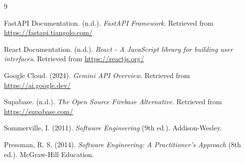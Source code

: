 \begin{thebibliography}{9}

FastAPI Documentation. (n.d.). \textit{FastAPI Framework}. Retrieved from \url{https://fastapi.tiangolo.com/}

React Documentation. (n.d.). \textit{React - A JavaScript library for building user interfaces}. Retrieved from \url{https://reactjs.org/}

Google Cloud. (2024). \textit{Gemini API Overview}. Retrieved from \url{https://ai.google.dev/}

Supabase. (n.d.). \textit{The Open Source Firebase Alternative}. Retrieved from \url{https://supabase.com/}

Sommerville, I. (2011). \textit{Software Engineering} (9th ed.). Addison-Wesley.

Pressman, R. S. (2014). \textit{Software Engineering: A Practitioner's Approach} (8th ed.). McGraw-Hill Education.

\end{thebibliography}
